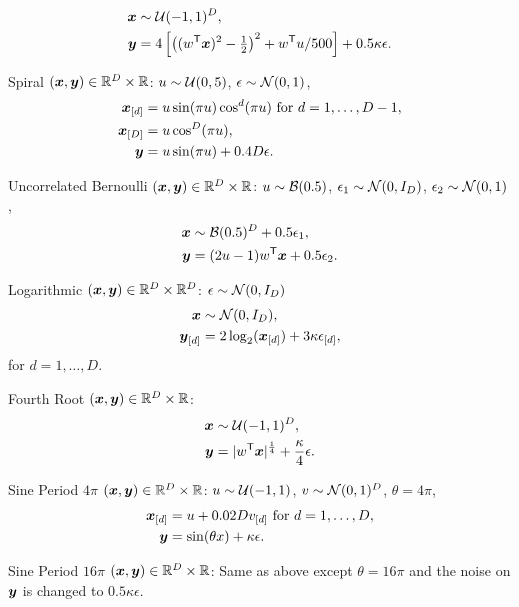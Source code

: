\documentclass[11pt]{article}
\begin{document}
\begin{compactenum}
\begin{align*}
\boldsymbol{x} &\sim \mathcal{U}(-1,1)^{D},\\
\boldsymbol{y}&=4\left[ \left( (w^{\mathsf{T}} \boldsymbol{x})^2 - \tfrac{1}{2} \right)^2 + w^{\mathsf{T}} u/500 \right]+0.5\kappa\epsilon.
\end{align*}
\item Spiral $(\boldsymbol{x},\boldsymbol{y}) \in \mathbb{R}^{D} \times \mathbb{R}$: $u \sim \mathcal{U}(0,5)$, $\epsilon \sim \mathcal{N}(0, 1)$,
\begin{align*}
\boldsymbol{x}_{[d]}&=u \sin(\pi u)  \cos^{d}(\pi u) \mbox{ for $d=1,\ldots,D-1$},\\
\boldsymbol{x}_{[D]}&=u \cos^{D}(\pi u),\\
\boldsymbol{y}&= u \sin(\pi u) +0.4 D\epsilon.
\end{align*}
\item Uncorrelated Bernoulli $(\boldsymbol{x},\boldsymbol{y}) \in \mathbb{R}^{D} \times \mathbb{R}$: $u \sim \mathcal{B}(0.5)$, $\epsilon_{1} \sim \mathcal{N}(0, I_{D})$, $\epsilon_{2} \sim \mathcal{N}(0, 1)$,
\begin{align*}
\boldsymbol{x} &\sim \mathcal{B}(0.5)^{D}+0.5\epsilon_{1},\\
\boldsymbol{y}&=(2u-1)w^{\mathsf{T}} \boldsymbol{x}+0.5\epsilon_{2}.
\end{align*}
\item Logarithmic $(\boldsymbol{x},\boldsymbol{y}) \in \mathbb{R}^{D} \times \mathbb{R}^{D}$: $\epsilon \sim \mathcal{N}(0, I_{D})$
\begin{align*}
\boldsymbol{x} &\sim \mathcal{N}(0, I_{D}),\\
\boldsymbol{y}_{[d]}&=2\log_{2}(\boldsymbol{x}_{[d]})+3\kappa\epsilon_{[d]},
\end{align*}
for $d=1,\ldots,D$.
\item Fourth Root $(\boldsymbol{x},\boldsymbol{y}) \in \mathbb{R}^{D} \times \mathbb{R}$:
\begin{align*}
\boldsymbol{x} &\sim \mathcal{U}(-1,1)^{D},\\
\boldsymbol{y}&=|w^{\mathsf{T}} \boldsymbol{x}|^\frac{1}{4}+\frac{\kappa}{4}\epsilon.
\end{align*}
\item Sine Period $4\pi$ $(\boldsymbol{x},\boldsymbol{y}) \in \mathbb{R}^{D} \times \mathbb{R}$: $u \sim \mathcal{U}(-1,1)$, $v \sim \mathcal{N}(0,1)^{D}$, $\theta=4\pi$,
\begin{align*}
\boldsymbol{x}_{[d]}&=u+0.02 D v_{[d]} \mbox{ for $d=1,\ldots,D$}, \\
\boldsymbol{y}&=\sin ( \theta x )+\kappa\epsilon.
\end{align*}
\item Sine Period $16\pi$ $(\boldsymbol{x},\boldsymbol{y}) \in \mathbb{R}^{D} \times \mathbb{R}$: Same as above except $\theta=16\pi$ and the noise on $\boldsymbol{y}$ is changed to $0.5\kappa\epsilon$.

\end{compactenum}
\end{document}
